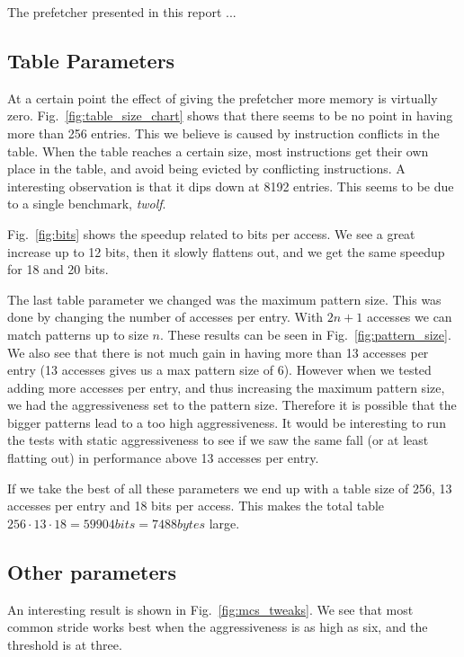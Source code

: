 The prefetcher presented in this report ...

\subsection{Table Parameters}
At a certain point the effect of giving the prefetcher more memory is virtually
zero. Fig.~\ref{fig:table_size_chart} shows that there seems to be no point in
having more than 256 entries. This we believe is caused by instruction
conflicts in the table. When the table reaches a certain size, most
instructions get their own place in the table, and avoid being evicted by
conflicting instructions.
A interesting observation is that it dips down at 8192 entries. This seems
to be due to a single benchmark, \emph{twolf}.

Fig.~\ref{fig:bits} shows the speedup related to bits per access.
We see a great increase up to 12 bits, then it slowly flattens out,
and we get the same speedup for 18 and 20 bits.

The last table parameter we changed was the maximum pattern size.
This was done by changing the number of accesses per entry.
With $2n+1$ accesses we can match patterns up to size $n$.
These results can be seen in Fig.~\ref{fig:pattern_size}.
We also see that there is not much gain in having more than 13
accesses per entry (13 accesses gives us a max pattern size of 6).
However when we tested adding more accesses per entry, and thus
increasing the maximum pattern size, we had the aggressiveness
set to the pattern size. Therefore it is possible that the bigger
patterns lead to a too high aggressiveness. It would be interesting
to run the tests with static aggressiveness to see if we saw the
same fall (or at least flatting out) in performance above 13 accesses
per entry.

If we take the best of all these parameters we end up with a table size
of 256, 13 accesses per entry and 18 bits per access. This makes
the total table $256 \cdot 13 \cdot 18 = 59904 bits = 7488 bytes$ large.

\subsection{Other parameters}
An interesting result is shown in Fig.~\ref{fig:mcs_tweaks}.
We see that most common stride works best when the aggressiveness
is as high as six, and the threshold is at three.
